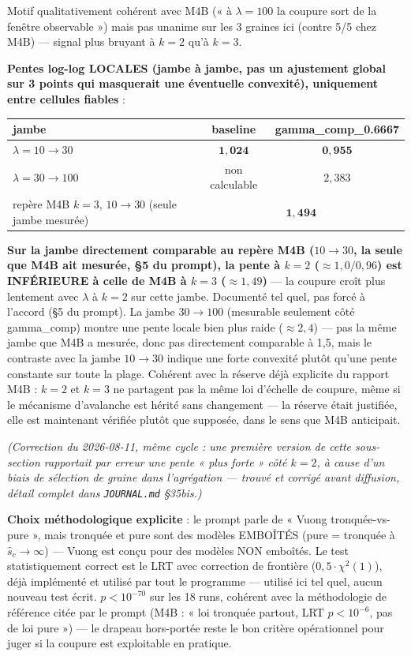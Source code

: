 \documentclass[11pt,a4paper]{article}
\newcommand{\code}[1]{\texttt{#1}}
\begin{document}
Motif qualitativement cohérent avec M4B (« à $\lambda=100$ la coupure sort
de la fenêtre observable ») mais pas unanime sur les 3 graines ici
(contre 5/5 chez M4B) --- signal plus bruyant à $k=2$ qu'à $k=3$.

\textbf{Pentes log-log LOCALES (jambe à jambe, pas un ajustement global
sur 3 points qui masquerait une éventuelle convexité), uniquement entre
cellules fiables} :

\begin{table}[H]
\centering
\begin{tabular}{lcc}
\toprule
jambe & baseline & gamma\_comp\_0.6667 \\
\midrule
$\lambda=10\to30$ & $\mathbf{1{,}024}$ & $\mathbf{0{,}955}$ \\
$\lambda=30\to100$ & non calculable & $2{,}383$ \\
repère M4B $k=3$, $10\to30$ (seule jambe mesurée) & \multicolumn{2}{c}{$\mathbf{1{,}494}$} \\
\bottomrule
\end{tabular}
\end{table}

\textbf{Sur la jambe directement comparable au repère M4B ($10\to30$, la
seule que M4B ait mesurée, \S5 du prompt), la pente à $k=2$
($\approx1{,}0/0{,}96$) est INFÉRIEURE à celle de M4B à $k=3$
($\approx1{,}49$)} --- la coupure croît plus lentement avec $\lambda$ à
$k=2$ sur cette jambe. Documenté tel quel, pas forcé à l'accord (\S5 du
prompt). La jambe $30\to100$ (mesurable seulement côté gamma\_comp)
montre une pente locale bien plus raide ($\approx2{,}4$) --- pas la même
jambe que M4B a mesurée, donc pas directement comparable à 1,5, mais le
contraste avec la jambe $10\to30$ indique une forte convexité plutôt
qu'une pente constante sur toute la plage. Cohérent avec la réserve déjà
explicite du rapport M4B : $k=2$ et $k=3$ ne partagent pas la même loi
d'échelle de coupure, même si le mécanisme d'avalanche est hérité sans
changement --- la réserve était justifiée, elle est maintenant vérifiée
plutôt que supposée, dans le sens que M4B anticipait.

\emph{(Correction du 2026-08-11, même cycle : une première version de
cette sous-section rapportait par erreur une pente « plus forte » côté
$k=2$, à cause d'un biais de sélection de graine dans l'agrégation ---
trouvé et corrigé avant diffusion, détail complet dans
\code{JOURNAL.md} \S35bis.)}

\textbf{Choix méthodologique explicite} : le prompt parle de « Vuong
tronquée-vs-pure », mais tronquée et pure sont des modèles EMBOÎTÉS (pure
= tronquée à $\hat{s}_c\to\infty$) --- Vuong est conçu pour des modèles NON
emboîtés. Le test statistiquement correct est le LRT avec correction de
frontière ($0{,}5\cdot\chi^2(1)$), déjà implémenté et utilisé par tout le
programme --- utilisé ici tel quel, aucun nouveau test écrit. $p<10^{-70}$
sur les 18 runs, cohérent avec la méthodologie de référence citée par le
prompt (M4B : « loi tronquée partout, LRT $p<10^{-6}$, pas de loi pure »)
--- le drapeau hors-portée reste le bon critère opérationnel pour juger si
la coupure est exploitable en pratique.
\end{document}
